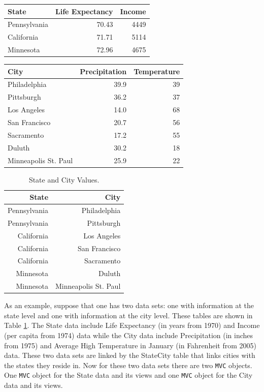 \documentclass{article}[11pt]
\newcommand{\Robject}[1]{{\texttt{#1}}}
\begin{document}
\small
\begin{tabular}[t]{ | l | r | r | }
  \hline
  State & Life Expectancy & Income \\ \hline
  Pennsylvania & 70.43 & 4449 \\ \hline
  California & 71.71 & 5114 \\ \hline
  Minnesota & 72.96 & 4675 \\ \hline
\end{tabular}
\hspace{10pt}
\begin{tabular}[t]{ | l | r | r | }
  \hline
  City & Precipitation & Temperature \\ \hline
  Philadelphia & 39.9 & 39 \\ \hline
  Pittsburgh & 36.2 & 37 \\ \hline
  Los Angeles & 14.0 & 68 \\ \hline
  San Francisco & 20.7 & 56 \\ \hline
  Sacramento & 17.2 & 55 \\ \hline
  Duluth & 30.2 & 18 \\ \hline
  Minneapolis St. Paul & 25.9 & 22 \\ \hline
\end{tabular}

\begin{table}[h]
  \begin{center}
    \begin{tabular}{ | r | r | }
      \hline
      State & City \\ \hline
      Pennsylvania & Philadelphia \\ \hline
      Pennsylvania & Pittsburgh \\ \hline
      California & Los Angeles \\ \hline
      California & San Francisco \\ \hline
      California & Sacramento \\ \hline
      Minnesota & Duluth \\ \hline
      Minnesota & Minneapolis St. Paul \\ \hline
    \end{tabular}
    \caption{State and City Values.}\label{Tab:CityState}
  \end{center}
\end{table}

\normalsize
As an example, suppose that one has two data sets: one with information at the
state level and one with information at the city level.  These tables are
shown in Table \ref{Tab:CityState}.  The State data include Life Expectancy
(in years from 1970) and Income (per capita from 1974) data
while the City data include Precipitation (in inches from 1975) and Average
High Temperature in January (in Fahrenheit from 2005)
data.  These two data sets are linked by the StateCity table that links cities
with the states they reside in.  Now for these two data sets there are
two \Robject{MVC} objects.  One \Robject{MVC} object for the State data and
its views and one \Robject{MVC} object for the City data and its views. 
\end{document}

